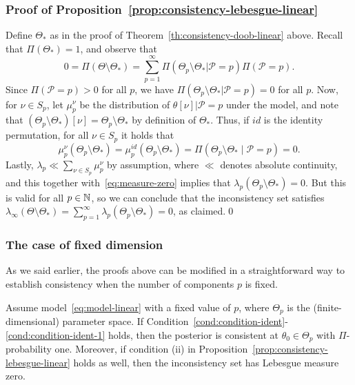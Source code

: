\subsubsection*{Proof of Proposition~\ref{prop:consistency-lebesgue-linear}}

Define \(\Theta_*\) as in the proof of Theorem~\ref{th:consistency-doob-linear} above. Recall that \(\Pi(\Theta_*)=1\), and observe that
\[
  0=\Pi(\Theta \setminus \Theta_*) = \sum_{p=1}^\infty \Pi(\Theta_p \setminus \Theta_*|\mathcal P = p)\Pi(\mathcal P = p).
\]
Since \(\Pi(\mathcal P = p)> 0\) for all \(p\), we have \(\Pi(\Theta_p\setminus \Theta_*|\mathcal P = p) = 0\) for all \(p\). Now, for \(\nu \in S_p\), let \(\mu^\nu_p\) be the distribution of \(\theta[\nu]|\mathcal P=p\) under the model, and note that \((\Theta_p\setminus \Theta_*)[\nu] = \Theta_p \setminus \Theta_*\) by definition of \(\Theta_*\). Thus, if \(id\) is the identity permutation, for all \(\nu\in S_p\) it holds that
\begin{equation}\label{eq:measure-zero}
  \mu^\nu_p (\Theta_p \setminus \Theta_*) = \mu_p^{id} (\Theta_p \setminus \Theta_*) = \Pi (\Theta_p \setminus \Theta_*\mid\mathcal P = p) =0.
\end{equation}
Lastly, \(\lambda_p \ll \sum_{\nu\in S_p}\mu^\nu_p\) by assumption, where \(\ll\) denotes absolute continuity, and this together with~\eqref{eq:measure-zero} implies that \(\lambda_p(\Theta_p \setminus \Theta_*)=0\). But this is valid for all \(p\in\mathbb{N}\), so we can conclude that the inconsistency set satisfies \(\lambda_\infty(\Theta\setminus \Theta_*) = \sum_{p=1}^\infty \lambda_p(\Theta_p\setminus \Theta_*)=0\), as claimed.\qed{}

\subsubsection*{The case of fixed dimension}

As we said earlier, the proofs above can be modified in a straightforward way to establish consistency when the number of components \(p\) is fixed.

\begin{corollary}
  Assume model~\eqref{eq:model-linear} with a fixed value of \(p\), where \(\Theta_p\) is the (finite-dimensional) parameter space. If Condition~\ref{cond:condition-ident}-\ref{cond:condition-ident-1} holds, then the posterior is consistent at \(\theta_0\in\Theta_p\) with \(\Pi\)-probability one. Moreover, if condition (ii) in Proposition~\ref{prop:consistency-lebesgue-linear} holds as well, then the inconsistency set has Lebesgue measure zero.
\end{corollary}

